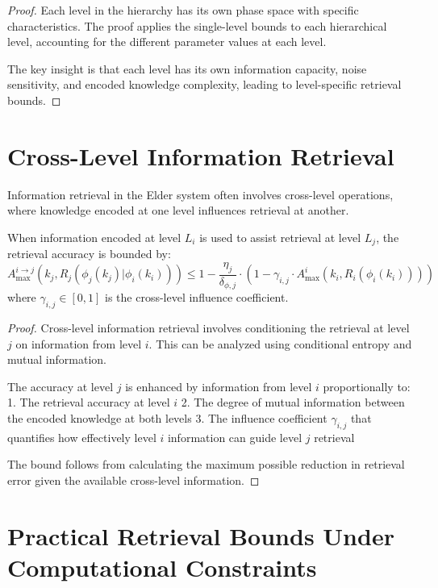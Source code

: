 \begin{proof}
Each level in the hierarchy has its own phase space with specific characteristics. The proof applies the single-level bounds to each hierarchical level, accounting for the different parameter values at each level.

The key insight is that each level has its own information capacity, noise sensitivity, and encoded knowledge complexity, leading to level-specific retrieval bounds.
\end{proof}

\section{Cross-Level Information Retrieval}

Information retrieval in the Elder system often involves cross-level operations, where knowledge encoded at one level influences retrieval at another.

\begin{theorem}
When information encoded at level $L_i$ is used to assist retrieval at level $L_j$, the retrieval accuracy is bounded by:
\begin{equation}
A_{\max}^{i \rightarrow j}(k_j, R_j(\phi_j(k_j) | \phi_i(k_i))) \leq 1 - \frac{\eta_j}{\delta_{\phi,j}} \cdot \left(1 - \gamma_{i,j} \cdot A_{\max}^i(k_i, R_i(\phi_i(k_i)))\right)
\end{equation}
where $\gamma_{i,j} \in [0,1]$ is the cross-level influence coefficient.
\end{theorem}

\begin{proof}
Cross-level information retrieval involves conditioning the retrieval at level $j$ on information from level $i$. This can be analyzed using conditional entropy and mutual information.

The accuracy at level $j$ is enhanced by information from level $i$ proportionally to:
1. The retrieval accuracy at level $i$
2. The degree of mutual information between the encoded knowledge at both levels
3. The influence coefficient $\gamma_{i,j}$ that quantifies how effectively level $i$ information can guide level $j$ retrieval

The bound follows from calculating the maximum possible reduction in retrieval error given the available cross-level information.
\end{proof}

\section{Practical Retrieval Bounds Under Computational Constraints}


